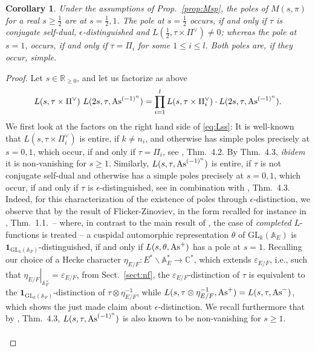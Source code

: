 \documentclass[a4paper,10pt]{amsart}
\newtheorem{cor}[equation]{Corollary}
\theoremstyle{definition}
\numberwithin{equation}{section}
\newcommand{\triv}{{\textbf{1}}}
\def\R{\mathbb R}
\def\A{\mathbb A}
\def\C{\mathbb C}
\def\ra{\rightarrow}
\begin{document}
\begin{cor}\label{cor:holMspi}
Under the assumptions of Prop.\ \ref{prop:Msp}, the poles of $M(s,\pi)$ for a real $s{\geq\frac12}$ are at $s=\tfrac12,1$. The pole at $s=\tfrac12$ occurs, if and only if $\tau$ is conjugate self-dual, $\epsilon$-distinguished and $L(\tfrac12,\tau\times \Pi^\vee)\neq 0$; whereas the pole at $s=1$, occurs, if and only if $\tau=\Pi_i$ for some $1\leq i\leq l$. Both poles are, if they occur, simple.
\end{cor}
\begin{proof}
Let $s\in\R_{\geq 0}$, and let us factorize as above 
\begin{equation}\label{eq:Lss}
L(s,\tau\times \Pi^\vee) \ L(2s, \tau, {\rm As}^{(-1)^n})=\prod_{i=1}^l L(s,\tau\times \Pi_i^\vee) \cdot L(2s, \tau, {\rm As}^{(-1)^n}).
\end{equation}
We first look at the factors on the right hand side of \eqref{eq:Lss}: It is well-known that $L(s,\tau\times\Pi_i^\vee)$ is entire, if $k\neq n_i$, and otherwise has simple poles precisely at $s=0,1$, which occur, if and only if $\tau=\Pi_i$, see \cite{cogdel}, Thm.\ 4.2. By Thm.\ 4.3, {\it ibidem} it is non-vanishing for $s\geq 1$. Similarly, $L(s, \tau, {\rm As}^{(-1)^n})$ is entire, if $\tau$ is not conjugate self-dual and otherwise has a simple poles precisely at $s=0,1$, which occur, if and only if $\tau$ is $\epsilon$-distinguished, see \cite{flickerzinoviev} in combination with \cite{grbacshahidi}, Thm.\ 4.3. Indeed, for this characterization of the existence of poles through $\epsilon$-distinction, we observe that by the result of Flicker-Zinoviev, in the form recalled for instance in
\cite{MOY}, Thm.\ 1.1.\ -- where, in contrast to the main result of \cite{flickerzinoviev}, the case of {\it completed} $L$-functions is treated -- a cuspidal
automorphic representation $\theta$ of \(\mathrm{GL}_k(\mathbb A_E)\) is \(\triv_{\mathrm{GL}_k(\mathbb A_F)}\)-distinguished, if and only if \(L(s,\theta, {\rm As}^+)\) has a pole at \(s=1\). Recalling our choice of a Hecke character \(\eta_{E/F} :E^*\backslash \A^*_E\ra\C^*\), which extends $\varepsilon_{E/F}$, i.e., such that $\left.\eta_{E/F}\right|_{\mathbb A_F^\times}=\varepsilon_{E/F}$, from Sect.\ \ref{sect:nf}, the \(\varepsilon_{E/F}\)-distinction of \(\tau\) is equivalent to the \(\triv_{\mathrm{GL}_k(\mathbb A_F)}\)-distinction of \(\tau\otimes\eta_{E/F}^{-1}\), while $L(s,\tau\otimes\eta_{E/F}^{-1},{\rm As}^+)=L(s,\tau,{\rm As}^-)$, which shows the just made claim about $\epsilon$-distinction. We recall furthermore that by \cite{grbacshahidi}, Thm.\ 4.3, $L(s, \tau, {\rm As}^{(-1)^n})$ is also known to be non-vanishing for $s\geq 1$.\\\\ 

\end{proof}
\end{document}
